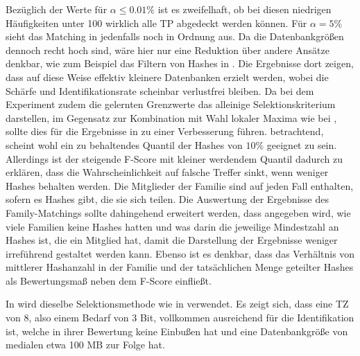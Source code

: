     Bezüglich der Werte für $\alpha \le 0.01\%$ ist es zweifelhaft, ob bei diesen niedrigen Häufigkeiten unter 100 wirklich alle \ac{TP} abgedeckt werden können. Für $\alpha=5\%$ sieht das Matching in  jedenfalls noch in Ordnung aus. Da die Datenbankgrößen dennoch recht hoch sind, wäre hier nur eine Reduktion über andere Ansätze denkbar, wie zum Beispiel das Filtern von Hashes in . Die Ergebnisse dort zeigen, dass auf diese Weise effektiv kleinere Datenbanken erzielt werden, wobei die Schärfe und Identifikationsrate scheinbar verlustfrei bleiben. Da bei dem Experiment zudem die gelernten Grenzwerte das alleinige Selektionskriterium darstellen, im Gegensatz zur Kombination mit Wahl lokaler Maxima wie bei , sollte dies für die Ergebnisse in  zu einer Verbesserung führen.  betrachtend, scheint wohl ein zu behaltendes Quantil der Hashes von $10\%$ geeignet zu sein. Allerdings ist der steigende F-Score mit kleiner werdendem Quantil dadurch zu erklären, dass die Wahrscheinlichkeit auf falsche Treffer sinkt, wenn weniger Hashes behalten werden. Die Mitglieder der Familie sind auf jeden Fall enthalten, sofern es Hashes gibt, die sie sich teilen. Die Auswertung der Ergebnisse des Family-Matchings sollte dahingehend erweitert werden, dass angegeben wird, wie viele Familien keine Hashes hatten und was darin die jeweilige Mindestzahl an Hashes ist, die ein Mitglied hat, damit die Darstellung der Ergebnisse weniger irreführend gestaltet werden kann. Ebenso ist es denkbar, dass das Verhältnis von mittlerer Hashanzahl in der Familie und der tatsächlichen Menge geteilter Hashes als Bewertungsmaß neben dem F-Score einfließt.

    In  wird dieselbe Selektionsmethode wie in  verwendet. Es zeigt sich, dass eine \acf{TZ} von 8, also einem Bedarf von 3 Bit, vollkommen ausreichend für die Identifikation ist, welche in ihrer Bewertung keine Einbußen hat und eine Datenbankgröße von medialen etwa 100 \acs{MB} zur Folge hat.

